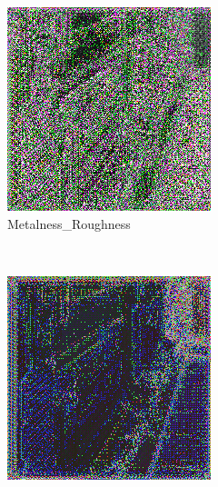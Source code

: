 \begin{figure}[h!]
\begin{subfigure}[b]{0.175\textwidth}
     \includegraphics[width=\textwidth]{figures/result/quadruple/normal_emissive_metalness_roughness/1.png}
     \caption{Metalness_Roughness}
    \end{subfigure}
    ~
    \begin{subfigure}[b]{0.175\textwidth}
     \includegraphics[width=\textwidth]{figures/result/quadruple/normal_emissive_roughness_position/1.png}

\end{subfigure}
\end{figure}
